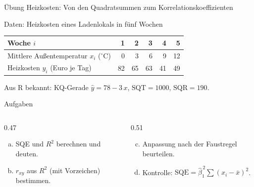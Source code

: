 \documentclass[aspectratio=169,11pt]{beamer}
\begin{document}
\begin{frame}{Übung Heizkosten: Von den Quadratsummen zum Korrelationskoeffizienten}
  \begin{block}{Daten: Heizkosten eines Ladenlokals in fünf Wochen}
    \vspace{-2pt}
    \begin{center}
      \renewcommand{\arraystretch}{1.05}
      \begin{tabular}{l*{5}{r}}
        \toprule
        Woche $i$                                      & 1  & 2  & 3  & 4  & 5  \\
        \midrule
        Mittlere Außentemperatur $x_i$ ($^\circ$C)     & 0  & 3  & 6  & 9  & 12 \\
        Heizkosten $y_i$ (Euro je Tag)                 & 82 & 65 & 63 & 41 & 49 \\
        \bottomrule
      \end{tabular}
    \end{center}
    \vspace{-2pt}
    Aus R bekannt: KQ-Gerade $\hat{y} = 78 - 3\,x$, \quad $\text{SQT} = 1000$, \quad $\text{SQR} = 190$.
  \end{block}

  \begin{exampleblock}{Aufgaben}
    \begin{columns}[T]
      \begin{column}{0.47\textwidth}
        \begin{enumerate}[a)]
          \item SQE und $R^{2}$ berechnen und deuten.
          \item $r_{xy}$ aus $R^{2}$ (mit Vorzeichen) bestimmen.
        \end{enumerate}
      \end{column}
      \begin{column}{0.51\textwidth}
        \begin{enumerate}[a)]
          \setcounter{enumi}{2}
          \item Anpassung nach der Faustregel beurteilen.
          \item Kontrolle: $\text{SQE} = \hat{\beta}_1^{\,2} \sum (x_i - \bar{x})^{2}$.
        \end{enumerate}
      \end{column}
    \end{columns}
  \end{exampleblock}
\end{frame}
\end{document}
